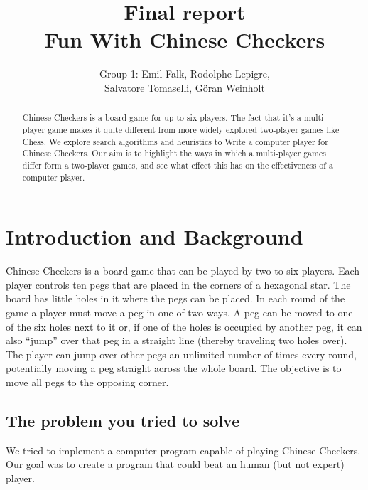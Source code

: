 \documentclass[a4paper,11pt]{article}
\begin{document}
\title{Final report\\Fun With Chinese Checkers}
\author{Group 1: Emil Falk, Rodolphe Lepigre,\\
        Salvatore Tomaselli, G\"oran Weinholt}
\maketitle
\begin{abstract}\centering
Chinese Checkers is a board game for up to six players. The fact that
it's a multi-player game makes it quite different from more widely
explored two-player games like Chess. We explore search algorithms and
heuristics to Write a computer player for Chinese Checkers. Our aim is
to highlight the ways in which a multi-player games differ form a
two-player games, and see what effect this has on the effectiveness of
a computer player.
\end{abstract}

\section{Introduction and Background}
Chinese Checkers is a board game that can be played by two to six players.
Each player controls ten pegs that are placed in the corners of a
hexagonal star. The board has little holes in it where the pegs can be
placed. In each round of the game a player must move a peg in one of
two ways. A peg can be moved to one of the six holes next to it or, if
one of the holes is occupied by another peg, it can also ``jump'' over
that peg in a straight line (thereby traveling two holes over). The
player can jump over other pegs an unlimited number of times every
round, potentially moving a peg straight across the whole board. The
objective is to move all pegs to the opposing corner.

\subsection{The problem you tried to solve}
We tried to implement a computer program capable of playing Chinese
Checkers. Our goal was to create a program that could beat an human
(but not expert) player.
\end{document}
